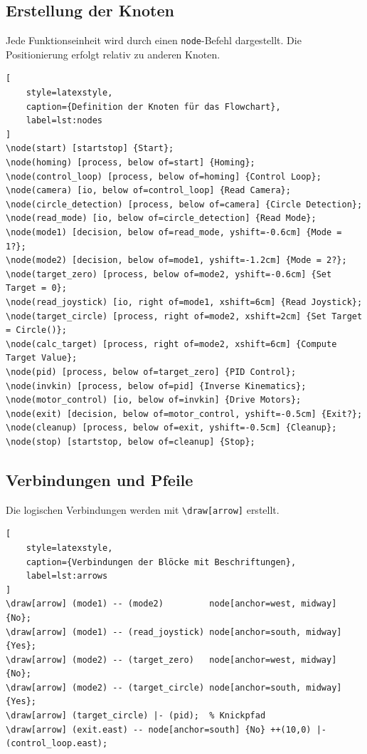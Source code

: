 \documentclass[twoside]{scrreprt}
\begin{document}
\subsection{Erstellung der Knoten}
Jede Funktionseinheit wird durch einen \texttt{node}-Befehl dargestellt.  
Die Positionierung erfolgt relativ zu anderen Knoten.

\begin{lstlisting}[
    style=latexstyle,
    caption={Definition der Knoten für das Flowchart},
    label=lst:nodes
]
\node(start) [startstop] {Start};
\node(homing) [process, below of=start] {Homing};
\node(control_loop) [process, below of=homing] {Control Loop};
\node(camera) [io, below of=control_loop] {Read Camera};
\node(circle_detection) [process, below of=camera] {Circle Detection};
\node(read_mode) [io, below of=circle_detection] {Read Mode};
\node(mode1) [decision, below of=read_mode, yshift=-0.6cm] {Mode = 1?};
\node(mode2) [decision, below of=mode1, yshift=-1.2cm] {Mode = 2?};
\node(target_zero) [process, below of=mode2, yshift=-0.6cm] {Set Target = 0};
\node(read_joystick) [io, right of=mode1, xshift=6cm] {Read Joystick};
\node(target_circle) [process, right of=mode2, xshift=2cm] {Set Target = Circle()};
\node(calc_target) [process, right of=mode2, xshift=6cm] {Compute Target Value};
\node(pid) [process, below of=target_zero] {PID Control};
\node(invkin) [process, below of=pid] {Inverse Kinematics};
\node(motor_control) [io, below of=invkin] {Drive Motors};
\node(exit) [decision, below of=motor_control, yshift=-0.5cm] {Exit?};
\node(cleanup) [process, below of=exit, yshift=-0.5cm] {Cleanup};
\node(stop) [startstop, below of=cleanup] {Stop};
\end{lstlisting}

\subsection{Verbindungen und Pfeile}
Die logischen Verbindungen werden mit \texttt{\textbackslash draw[arrow]} erstellt.

\begin{lstlisting}[
    style=latexstyle,
    caption={Verbindungen der Blöcke mit Beschriftungen},
    label=lst:arrows
]
\draw[arrow] (mode1) -- (mode2)         node[anchor=west, midway] {No};
\draw[arrow] (mode1) -- (read_joystick) node[anchor=south, midway] {Yes};
\draw[arrow] (mode2) -- (target_zero)   node[anchor=west, midway] {No};
\draw[arrow] (mode2) -- (target_circle) node[anchor=south, midway] {Yes};
\draw[arrow] (target_circle) |- (pid);  % Knickpfad
\draw[arrow] (exit.east) -- node[anchor=south] {No} ++(10,0) |- (control_loop.east);
\end{lstlisting}
\end{document}
